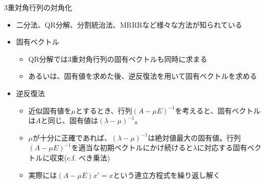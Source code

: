 \begin{frame}[t,fragile]{3重対角行列の対角化}
  \begin{itemize}
  \item 二分法、QR分解、分割統治法、MRRRなど様々な方法が知られている
  \item 固有ベクトル
    \begin{itemize}
    \item QR分解では3重対角行列の固有ベクトルも同時に求まる
    \item あるいは、固有値を求めた後、逆反復法を用いて固有ベクトルを求める
    \end{itemize}
  \item 逆反復法
    \begin{itemize}
    \item 近似固有値を$\mu$とするとき、行列$(A - \mu E)^{-1}$を考えると、固有ベクトルは$A$と同じ、固有値は$(\lambda-\mu)^{-1}$。
    \item $\mu$が十分に正確であれば、$(\lambda-\mu)^{-1}$は絶対値最大の固有値。行列$(A - \mu E)^{-1}$を適当な初期ベクトルにかけ続けると$\lambda$に対応する固有ベクトルに収束(c.f. べき乗法)
    \item 実際には$(A-\mu E) x' = x$という連立方程式を繰り返し解く
    \end{itemize}
  \end{itemize}
\end{frame}
